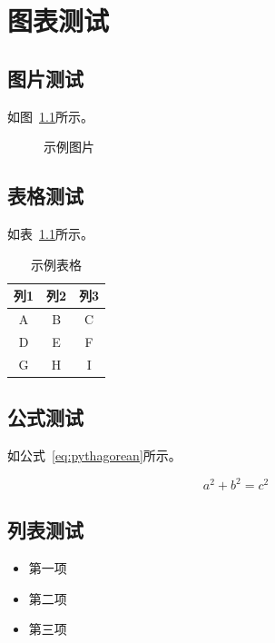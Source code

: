 \documentclass{sduthesis}
\begin{document}
\chapter{图表测试}

\section{图片测试}

如图~\ref{fig:example}所示。

\begin{figure}[htbp]
  \centering
  \caption{示例图片}
  \label{fig:example}
\end{figure}

\section{表格测试}

如表~\ref{tab:example}所示。

\begin{table}[htbp]
  \centering
  \caption{示例表格}
  \label{tab:example}
  \begin{tabular}{ccc}
    \toprule
    列1 & 列2 & 列3 \\
    \midrule
    A & B & C \\
    D & E & F \\
    G & H & I \\
    \bottomrule
  \end{tabular}
\end{table}

\section{公式测试}

如公式~\ref{eq:pythagorean}所示。

\begin{equation}
  \label{eq:pythagorean}
  a^2 + b^2 = c^2
\end{equation}

\section{列表测试}

\begin{itemize}
  \item 第一项
  \item 第二项
  \item 第三项
\end{itemize}
\end{document}
